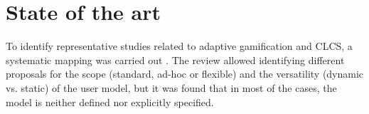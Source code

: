 \documentclass[sigconf]{acmart}
\begin{document}






\section{State of the art}


 

To identify representative studies related to adaptive gamification and CLCS, a systematic mapping
was carried out \cite{petersen_guidelines_2015}. The review allowed identifying different proposals for the scope (standard, ad-hoc or flexible) and the versatility (dynamic vs. static) of the user model, but it was found that in most of the cases, the model is neither defined nor explicitly specified. 
\end{document}
